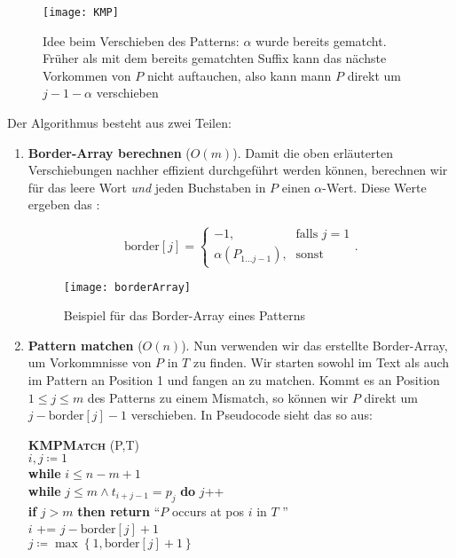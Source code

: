 \begin{figure}[H]
  \texttt{[image: KMP]}
  \caption{Idee beim Verschieben des Patterns: \( \alpha \) wurde bereits gematcht. Früher als mit dem bereits gematchten Suffix kann das nächste Vorkommen von \( P \) nicht auftauchen, also kann mann \( P \) direkt um \( j - 1 - \alpha \) verschieben}
\end{figure}

Der Algorithmus besteht aus zwei Teilen:
\begin{enumerate}
  \item \textbf{Border-Array berechnen} (\( O(m) \)). Damit die oben erläuterten Verschiebungen nachher effizient durchgeführt werden können, berechnen wir für das leere Wort \emph{und} jeden Buchstaben in \( P \) einen \( \alpha \)-Wert. Diese Werte ergeben das \label{def:borderArray}:
  \begin{minipage}{.55\textwidth}
    \begin{equation*}
      \text{border}[j] = \begin{cases}
        -1\text{,} &\text{falls } j = 1 \\
        \alpha(P_{1 \dots j-1})\text{,} &\text{sonst}
      \end{cases}\text{.}
    \end{equation*}
  \end{minipage}
  \hfill
  \begin{minipage}{.35\textwidth}
    \begin{figure}[H]
      \texttt{[image: borderArray]}
      \caption{Beispiel für das Border-Array eines Patterns}
    \end{figure}
  \end{minipage}

  \item \textbf{Pattern matchen} (\( O(n) \)). Nun verwenden wir das erstellte Border-Array, um Vorkommnisse von \( P \) in \( T \) zu finden. Wir starten sowohl im Text als auch im Pattern an Position 1 und fangen an zu matchen. Kommt es an Position \( 1 \leq j \leq m \) des Patterns zu einem Mismatch, so können wir \( P \) direkt um \( j - \text{border}[j] - 1 \) verschieben. In Pseudocode sieht das so aus:
  \begin{pseudocode}
    \textbf{\textsc{KMPMatch}} (P,T) \\
    \( i,j \coloneqq 1 \) \\
    \textbf{while} \( i \leq n - m + 1 \) \\
    \phantom{\quad} \textbf{while} \( j \leq m \wedge t_{i+j-1} = p_j \) \textbf{do} \( j \)++ \\
    \phantom{\quad} \textbf{if} \( j > m \) \textbf{then return} ``\( P \) occurs at pos \( i \) in \( T \) '' \\
    \phantom{\quad} \( i \) += \( j - \text{border}[j] + 1 \) \\
    \phantom{\quad} \( j \coloneqq \max\left \{ 1, \text{border}[j]+1 \right \} \)
  \end{pseudocode}
\end{enumerate}

